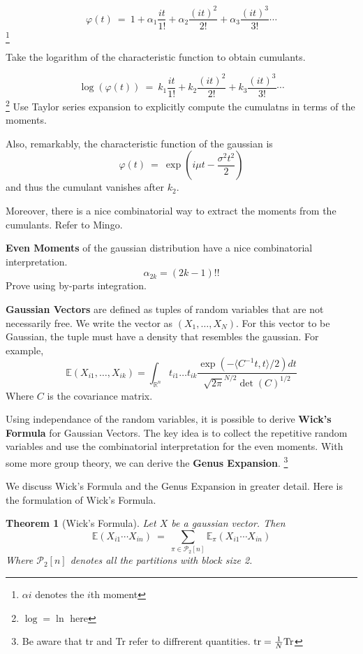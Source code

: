 \documentclass{article}
\def\<{{\langle}}
\def\>{{\rangle}}
\newtheorem{theorem}{Theorem}
\begin{document}
\[
    \varphi(t) \ = \ 
    1 + \alpha_1 \frac {it}{1!} 
    + \alpha_2 \frac {(it)^2}{2!}
    + \alpha_3 \frac {(it)^3}{3!}
    \cdots
\]\footnote{$\alpha{i}$ denotes the $i$th moment}

Take the logarithm of the characteristic function to 
obtain cumulants. 

\[
    \log(\varphi(t)) \ = \ 
    k_1 \frac {it}{1!} 
    + k_2 \frac {(it)^2}{2!}
    + k_3 \frac {(it)^3}{3!}
    \cdots
\]
\footnote{$\log = \ln$ here}
Use Taylor series expansion to explicitly compute 
the cumulatns in terms of the moments. 

Also, remarkably, the characteristic function of the 
gaussian is 
\[
\varphi(t) \ = \ \exp(i\mu t - \frac {\sigma^2 t^2 } 2)
\]
and thus the cumulant vanishes after $k_2$. 

Moreover, there is a nice combinatorial way to extract 
the moments from the cumulants. Refer to Mingo. 

\textbf{Even Moments} of the gaussian distribution 
have a nice combinatorial interpretation. 
\[
    \alpha_{2k} = (2k - 1)!!
\]
Prove using by-parts integration. 

\textbf{Gaussian Vectors} are defined as tuples 
of random variables that are not necessarily free. 
We write the vector as $(X_1, \dots, X_N)$. For 
this vector to be Gaussian, the tuple must have 
a density that resembles the gaussian. For example, 
\[
    \mathbb{E}(X_{i1}, \dots, X_{ik})
     = \int_{\mathbb{R}^n} t_{i1} \dots t_{ik} 
     \frac{
        \exp(-\<C^{-1}t, t\>/2)dt
     }
     {
        \sqrt{2\pi}^{N/2} \det(C)^{1/2}
     }
\]
Where $C$ is the covariance matrix. 

Using independance of the random variables, it is possible to derive 
\textbf{Wick's Formula} for Gaussian Vectors. 
The key idea is to collect the repetitive random variables 
and use the combinatorial interpretation for the 
even moments. With some more group theory, we can derive the \textbf{Genus 
Expansion}. \footnote{Be aware that tr and Tr refer 
to diffrerent quantities. $\text{tr} = \frac 1 N \textrm{Tr}$}

We discuss Wick's Formula and the Genus Expansion in 
greater detail. Here is the formulation of 
Wick's Formula. 

\newcommand{\PP}{\mathcal{P}}
\newcommand{\EE}{\mathbb{E}}

\begin{theorem}[Wick's Formula]
Let $X$ be a gaussian vector. Then 
\[
    \mathbb{E} (
        X_{i1} \cdots X_{in} 
    ) \ = \ 
    \sum_{\pi \in \PP_2[n]} \EE_\pi(X_{i1} \cdots X_{in} )
\]
Where $\PP_2[n]$ denotes all the partitions with block size 2. 
\end{theorem}
\end{document}
